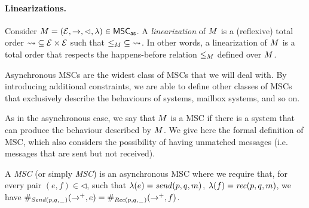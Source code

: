 \documentclass{article}
\begin{document}


\paragraph*{Linearizations.}

Consider $\msc = (\Events,\procrel,\lhd,\lambda) \in \asMSCs$.
A \emph{linearization} of $\msc$ is a (reflexive) total order ${\linrel} \subseteq \Events \times \Events$ such that ${\le_\msc} \subseteq {\linrel}$. In other words, a linearization of $\msc$ is a total order that respects the happens-before relation $\le_\msc$ defined over $\msc$.

\medskip

Asynchronous MSCs are the widest class of MSCs that we will deal with. By introducing additional constraints, we are able to define other classes of MSCs that exclusively describe the behaviours of \pp systems, mailbox systems, and so on.

As in the asynchronous case, we say that $\msc$ is a \pp MSC if there is a \pp system that can produce the behaviour described by $\msc$. We give here the formal definition of \pp MSC, which also considers the possibility of having unmatched messages (i.e. messages that are sent but not received).

\begin{definition}
A \emph{\pp MSC} (or simply \emph{MSC}) is an asynchronous MSC where we require that, for every pair $(e,f) \in {\lhd}$, such that $\lambda(e) = \sact{p}{q}{\msg}$, $\lambda(f) = \ract{p}{q}{\msg}$, we have $\sametype{e}{\pqsAct{p}{q}}{\procrel^+} = \sametype{f}{\pqrAct{p}{q}}{\procrel^+}$.
\end{definition}
\end{document}
